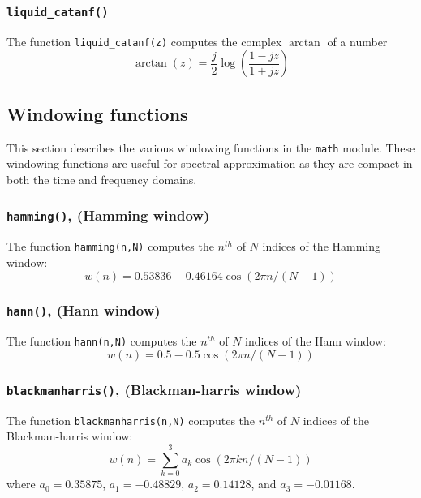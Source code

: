 \subsubsection{{\tt liquid\_catanf()}}
\label{module:math:complex:catanf}
The function {\tt liquid\_catanf(z)}
computes the complex $\arctan$ of a number
%
\begin{equation}
\label{eqn:math:catanf}
    \arctan(z) =
        \frac{j}{2}
        \log\left( \frac{1-jz}{1+jz} \right)
\end{equation}
%


% 
%
\subsection{Windowing functions}
\label{module:math:window}
This section describes the various windowing functions in the {\tt math}
module.
These windowing functions are useful for spectral approximation as they
are compact in both the time and frequency domains.

\subsubsection{{\tt hamming()}, (Hamming window)}
\label{module:math:window:hamming}
The function {\tt hamming(n,N)} computes the $n^{th}$ of $N$ indices of
the Hamming window:
%
\begin{equation}
\label{eqn:math:window:hamming}
    w(n) = 0.53836 - 0.46164 \cos\left( 2 \pi n / (N-1) \right)
\end{equation}
%

\subsubsection{{\tt hann()}, (Hann window)}
\label{module:math:window:hann}
The function {\tt hann(n,N)} computes the $n^{th}$ of $N$ indices of
the Hann window:
%
\begin{equation}
\label{eqn:math:window:hann}
    w(n) = 0.5 - 0.5 \cos\left( 2 \pi n / (N-1) \right)
\end{equation}
%

\subsubsection{{\tt blackmanharris()}, (Blackman-harris window)}
\label{module:math:window:blackmanharris}
The function {\tt blackmanharris(n,N)} computes the $n^{th}$ of $N$
indices of the Blackman-harris window:
%
\begin{equation}
\label{eqn:math:window:blackmanharris}
    w(n) = \sum_{k=0}^{3} { a_k \cos\left( 2 \pi k n / (N-1)\right) }
\end{equation}
%
where
$a_0 =  0.35875$,
$a_1 = -0.48829$,
$a_2 =  0.14128$, and
$a_3 = -0.01168$.

